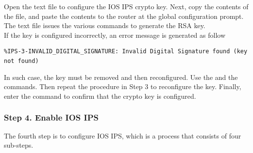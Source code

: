 Open the text file to configure the IOS IPS crypto key. Next, copy the contents of the file, and paste the contents to the router at the global configuration prompt. The text file issues the various commands to generate the RSA key.\\

If the key is configured incorrectly, an error message is generated as follow

\begin{verbatim}
%IPS-3-INVALID_DIGITAL_SIGNATURE: Invalid Digital Signature found (key not found)
\end{verbatim}

In such case, the key must be removed and then reconfigured. Use the  and the  commands. Then repeat the procedure in Step 3 to reconfigure the key. Finally, enter the  command to confirm that the crypto key is configured.

\subsubsection{Step 4. Enable IOS IPS}

The fourth step is to configure IOS IPS, which is a process that consists of four sub-steps.


